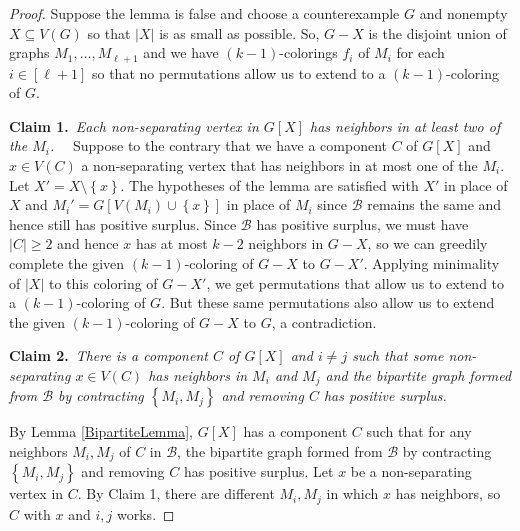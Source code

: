\documentclass[12pt]{article}
\theoremstyle{plain}
\theoremstyle{definition}
\theoremstyle{remark}
\newcommand{\fancy}[1]{\mathcal{#1}}
\newcommand{\B}{\fancy{B}}
\newcommand{\set}[1]{\left\{ #1 \right\}}
\newcommand{\irange}[1]{\left[#1\right]}
\newcommand{\claim}[2]{{\bf Claim #1.}~{\it #2}~~}
\begin{document}
\begin{proof}
Suppose the lemma is false and choose a counterexample $G$ and nonempty $X \subseteq V(G)$ so that $|X|$ is as small as possible.  So, $G-X$ is the disjoint union of graphs $M_1, \ldots, M_{\ell + 1}$ and we have $(k-1)$-colorings $f_i$ of $M_i$ for each $i \in \irange{\ell + 1}$ so that no permutations allow us to extend to a $(k - 1)$-coloring of $G$.

\claim{1}{Each non-separating vertex in $G[X]$ has neighbors in at least two of the $M_i$.}
Suppose to the contrary that we have a component $C$ of $G[X]$ and $x \in V(C)$ a non-separating vertex that has neighbors in at most one of the $M_i$.  Let $X' = X \setminus \set{x}$.  The hypotheses of the lemma are satisfied with $X'$ in place of $X$ and $M_i' = G[V(M_i) \cup \set{x}]$ in place of $M_i$ since $\B$ remains the same and hence still has positive surplus. Since $\B$ has positive surplus, we must have $|C| \ge 2$ and hence $x$ has at most $k-2$ neighbors in $G-X$, so we can greedily complete the given $(k-1)$-coloring of $G-X$ to $G-X'$. Applying minimality of $|X|$ to this coloring of $G-X'$, we get permutations that allow us to extend to a $(k - 1)$-coloring of $G$.  But these same permutations also allow us to extend the given $(k-1)$-coloring of $G-X$ to $G$, a contradiction.

\claim{2}{There is a component $C$ of $G[X]$ and $i \ne j$ such that some non-separating $x \in V(C)$ has neighbors in $M_i$ and $M_j$ and the bipartite graph formed from $\B$ by contracting $\set{M_i, M_j}$ and removing $C$ has positive surplus.}

By Lemma \ref{BipartiteLemma}, $G[X]$ has a component $C$ such that for any neighbors $M_i, M_j$ of $C$ in $\B$, the bipartite graph formed from $\B$ by contracting $\set{M_i, M_j}$ and removing $C$ has positive surplus.  Let $x$ be a non-separating vertex in $C$.  By Claim 1, there are different $M_i, M_j$ in which $x$ has neighbors, so $C$ with $x$ and $i,j$ works. 


\end{proof}
\end{document}
